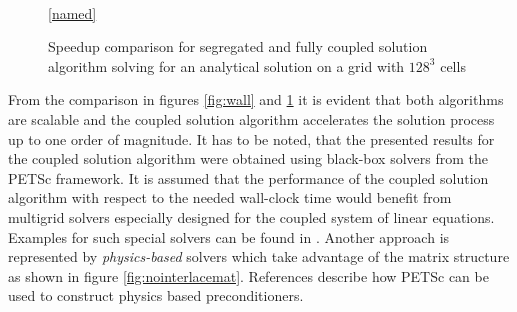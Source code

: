 \begin{figure}
  \setlength{\abovecaptionskip}{5pt plus 3pt minus 2pt}
  \begin{center}
    \\
  \ref{named}
  \end{center}
  \caption{Speedup comparison for segregated and fully coupled solution algorithm solving for an analytical solution on a grid with $128^3$ cells}
   \label{fig:speedup}
\end{figure}

From the comparison in figures \ref{fig:wall} and \ref{fig:speedup} it is evident that both algorithms are scalable and the coupled solution algorithm accelerates the solution process up to one order of magnitude. It has to be noted, that the presented results for the coupled solution algorithm were obtained using black-box solvers from the PETSc framework. It is assumed that the performance of the coupled solution algorithm with respect to the needed wall-clock time would benefit from multigrid solvers especially designed for the coupled system of linear equations. Examples for such special solvers can be found in \cite{darwish09,mangani14,klaij13}. Another approach is represented by \emph{physics-based} solvers which take advantage of the matrix structure as shown in figure \ref{fig:nointerlacemat}. References \cite{brown12,mcinnes14} describe how PETSc can be used to construct physics based preconditioners.

